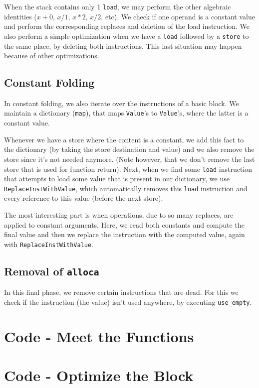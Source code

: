 When the stack contains only 1 \texttt{load}, we may perform the other algebraic identities ($x + 0$, $x / 1$, $x * 2$, $x / 2$, etc). We check if one operand is a constant value and perform
the corresponding replaces and deletion of the load instruction. We also perform a simple optimization when we have a \texttt{load} followed by a \texttt{store} to the same place,
    by deleting both instructions. This last situation may happen because of other optimizations.

\subsection{Constant Folding}

In constant folding, we also iterate over the instructions of a basic block. We maintain a dictionary (\texttt{map}), that maps \texttt{Value}'s to \texttt{Value}'s, where the latter is a constant value.

Whenever we have a store where the content is a constant, we add this fact to the dictionary (by taking the store destination and value) and we also remove the store since it's not needed anymore. (Note however, that we don't remove the last store that is used for function return). Next, when we find some \texttt{load} instruction that attempts to load some value that is present in our dictionary, we use
\texttt{ReplaceInstWithValue}, which automatically removes this \texttt{load} instruction and every reference to this value (before the next store).

The most interesting part is when operations, due to so many replaces, are applied to constant arguments. Here, we read both constants and compute the final value and then we replace the instruction with the computed value, again with \texttt{ReplaceInstWithValue}.

\subsection{Removal of \texttt{alloca}}

In this final phase, we remove certain instructions that are dead. For this we check if the instruction (the value) isn't used anywhere, by executing \texttt{use\_empty}.

\section{Code - Meet the Functions}

{\tiny }

\section{Code - Optimize the Block}

{\tiny }


